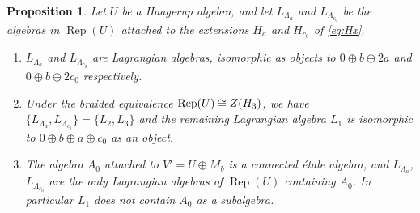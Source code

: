\documentclass[leqno]{article}
\let\cal\relax
\newcommand{\cal}{\mathcal}
\DeclareMathOperator{\Rep}{Rep} %
\newtheorem{prop}[thm]{Proposition}
\numberwithin{equation}{section}
\begin{document}
\begin{prop}
\label{prop:lagrangian-objects}
Let $U$ be a Haagerup algebra, and let $L_{\Lambda_a}$ and $L_{\Lambda_{c_0}}$ be the algebras in $\Rep(U)$ attached to the extensions $H_a$ and $H_{c_0}$ of \eqref{eq:Hx}.
\begin{enumerate}
\item $L_{\Lambda_a}$ and $L_{\Lambda_{c_0}}$ are Lagrangian algebras, isomorphic as objects to $0 \oplus b \oplus 2a$ and $0 \oplus b \oplus 2c_0$ respectively.
\item Under the braided equivalence $\Rep(U) \cong Z(\cal H_3)$, we have $\{L_{\Lambda_a},L_{\Lambda_{c_0}}\} = \{L_2,L_3\}$ and the remaining Lagrangian algebra $L_1$ is isomorphic to $0 \oplus b \oplus a \oplus c_0$ as an object.
\item The algebra $A_0$ attached to $V' = U \oplus M_b$ is a connected \'etale algebra, and $L_{\Lambda_a}$, $L_{\Lambda_{c_0}}$ are the only Lagrangian algebras of $\Rep(U)$ containing $A_0$. In particular $L_1$ does not contain $A_0$ as a subalgebra.
\end{enumerate}
\end{prop}
\end{document}
